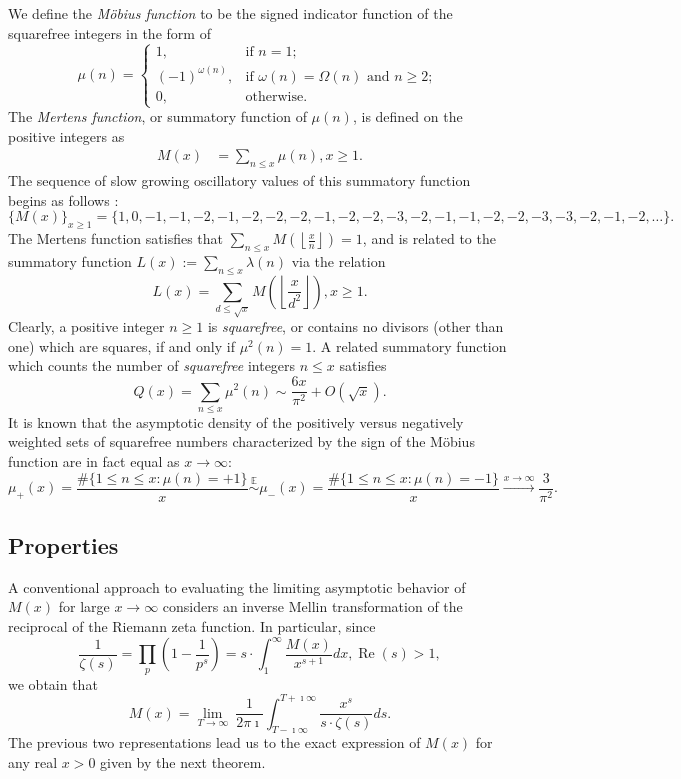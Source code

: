 \documentclass[11pt,reqno,a4letter]{article}
\numberwithin{figure}{section}
\numberwithin{table}{section}
\newcommand{\seqnum}[1]{\href{http://oeis.org/#1}{\color{ProcessBlue}{\underline{#1}}}}
\newcommand{\Floor}[2]{\ensuremath{\left\lfloor \frac{#1}{#2} \right\rfloor}}
\theoremstyle{plain}
\numberwithin{theorem}{section}
\theoremstyle{definition}
\renewcommand{\Re}{\operatorname{Re}}
\begin{document}
We define the \emph{M\"obius function} to be the signed indicator function 
of the squarefree integers in the form of \cite[\seqnum{A008683}]{OEIS} 
\[
\mu(n) = \begin{cases} 
     1, & \text{if $n = 1$; } \\ 
     (-1)^{\omega(n)}, & \text{if $\omega(n) = \Omega(n)$ and $n \geq 2$; } \\ 
     0, & \text{otherwise.} 
     \end{cases} 
\]
The \emph{Mertens function}, or summatory function of $\mu(n)$, is defined on the 
positive integers as 
\begin{align*} 
M(x) & = \sum_{n \leq x} \mu(n), x \geq 1. 
\end{align*} 
The sequence of slow growing oscillatory values of this 
summatory function begins as follows \cite[\seqnum{A002321}]{OEIS}: 
\[
\{M(x)\}_{x \geq 1} = \{1, 0, -1, -1, -2, -1, -2, -2, -2, -1, -2, -2, -3, -2, 
     -1, -1, -2, -2, -3, -3, -2, -1, -2, \ldots\}. 
\] 
The Mertens function satisfies that $\sum_{n \leq x} M\left(\Floor{x}{n}\right) = 1$, and is related 
to the summatory function $L(x) := \sum_{n \leq x} \lambda(n)$ via the relation 
\cite{LEHMAN-1960} 
\[
L(x) = \sum_{d \leq \sqrt{x}} M\left(\Floor{x}{d^2}\right), x \geq 1. 
\]
Clearly, a positive integer $n \geq 1$ is \emph{squarefree}, or contains no divisors (other than one) which are 
squares, if and only if $\mu^2(n) = 1$. 
A related summatory function which counts the 
number of \emph{squarefree} integers $n \leq x$ satisfies 
\cite[\S 18.6]{HARDYWRIGHT} \cite[\seqnum{A013928}]{OEIS} 
\[ 
Q(x) = \sum_{n \leq x} \mu^2(n) \sim \frac{6x}{\pi^2} + O\left(\sqrt{x}\right). 
\] 
It is known that the asymptotic density of the positively versus negatively 
weighted sets of squarefree numbers characterized by the sign of the 
M\"obius function are in fact equal as $x \rightarrow \infty$: 
\[
\mu_{+}(x) = \frac{\#\{1 \leq n \leq x: \mu(n) = +1\}}{x} \overset{\mathbb{E}}{\sim} 
     \mu_{-}(x) = \frac{\#\{1 \leq n \leq x: \mu(n) = -1\}}{x} 
     \xrightarrow{x \rightarrow \infty} \frac{3}{\pi^2}. 
\]

\subsection{Properties} 

A conventional approach to evaluating the limiting asymptotic 
behavior of $M(x)$ for large $x \rightarrow \infty$ considers an 
inverse Mellin transformation of the reciprocal of the Riemann zeta function. 
In particular, since 
\[
\frac{1}{\zeta(s)} = \prod_{p} \left(1 - \frac{1}{p^s}\right) = 
     s \cdot \int_1^{\infty} \frac{M(x)}{x^{s+1}} dx, \Re(s) > 1, 
\]
we obtain that 
\[
M(x) = \lim_{T \rightarrow \infty}\ \frac{1}{2\pi\imath} \int_{T-\imath\infty}^{T+\imath\infty} 
     \frac{x^s}{s \cdot \zeta(s)} ds. 
\] 
The previous two representations lead us to the 
exact expression of $M(x)$ for any real $x > 0$ 
given by the next theorem. 
\nocite{TITCHMARSH} 
\end{document}
